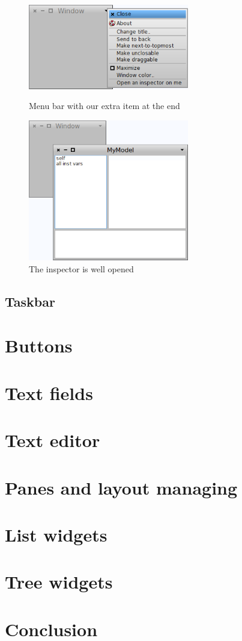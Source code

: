 \documentclass[a4paper,10pt,twoside]{book}
\begin{document}
\begin{figure}[ht]\centering
	\includegraphics[width=7cm]{MenuBar}
	\caption{Menu bar with our extra item at the end}
	\label{fig:menuBar}
	\includegraphics[width=7cm]{WindowAndInspector}
	\caption{The inspector is well opened}
	\label{fig:windowAndInspector}
\end{figure}

\subsection{Taskbar}

\section{Buttons}

\section{Text fields}

\section{Text editor}

\section{Panes and layout managing}

\section{List widgets}

\section{Tree widgets}

\section{Conclusion}

\ifx\wholebook\relax\else
   
   
\end{document}
